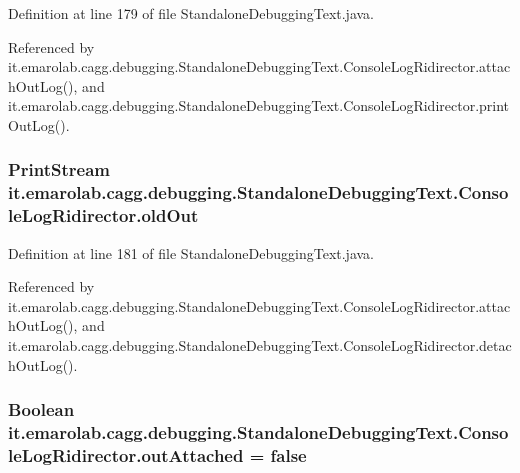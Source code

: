 Definition at line 179 of file Standalone\-Debugging\-Text.\-java.



Referenced by it.\-emarolab.\-cagg.\-debugging.\-Standalone\-Debugging\-Text.\-Console\-Log\-Ridirector.\-attach\-Out\-Log(), and it.\-emarolab.\-cagg.\-debugging.\-Standalone\-Debugging\-Text.\-Console\-Log\-Ridirector.\-print\-Out\-Log().

\hypertarget{classit_1_1emarolab_1_1cagg_1_1debugging_1_1StandaloneDebuggingText_1_1ConsoleLogRidirector_ab1648f30e5481166e5b6d80b4c73f5dd}{
\subsubsection[{old\-Out}]{\setlength{\rightskip}{0pt plus 5cm}Print\-Stream it.\-emarolab.\-cagg.\-debugging.\-Standalone\-Debugging\-Text.\-Console\-Log\-Ridirector.\-old\-Out\hspace{0.3cm}{\ttfamily [private]}}}\label{classit_1_1emarolab_1_1cagg_1_1debugging_1_1StandaloneDebuggingText_1_1ConsoleLogRidirector_ab1648f30e5481166e5b6d80b4c73f5dd}


Definition at line 181 of file Standalone\-Debugging\-Text.\-java.



Referenced by it.\-emarolab.\-cagg.\-debugging.\-Standalone\-Debugging\-Text.\-Console\-Log\-Ridirector.\-attach\-Out\-Log(), and it.\-emarolab.\-cagg.\-debugging.\-Standalone\-Debugging\-Text.\-Console\-Log\-Ridirector.\-detach\-Out\-Log().

\hypertarget{classit_1_1emarolab_1_1cagg_1_1debugging_1_1StandaloneDebuggingText_1_1ConsoleLogRidirector_a61365831ad47d960c5679b369b83e52f}{
\subsubsection[{out\-Attached}]{\setlength{\rightskip}{0pt plus 5cm}Boolean it.\-emarolab.\-cagg.\-debugging.\-Standalone\-Debugging\-Text.\-Console\-Log\-Ridirector.\-out\-Attached = false\hspace{0.3cm}{\ttfamily [private]}}}\label{classit_1_1emarolab_1_1cagg_1_1debugging_1_1StandaloneDebuggingText_1_1ConsoleLogRidirector_a61365831ad47d960c5679b369b83e52f}


